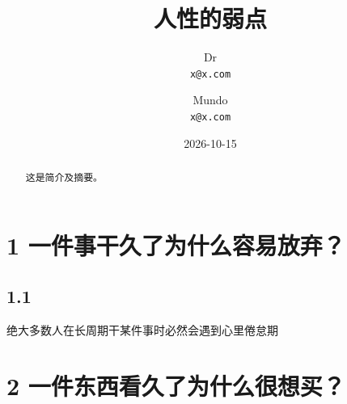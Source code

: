 \documentclass{article}
\title{\textbf{人性}的弱点} %
\author{
    Dr\\ %
    {\small \texttt{x@x.com}} %
    \and %
    Mundo\\
    {\small \texttt{x@x.com}}
}
\date{2026-10-15} %
\begin{document}
\maketitle %


\begin{abstract}
这是简介及摘要。
\end{abstract}

\section*{1 一件事干久了为什么容易放弃？} %

\subsection*{1.1}

绝大多数人在长周期干某件事时必然会遇到心里倦怠期

\section*{2 一件东西看久了为什么很想买？}


\clearpage
\end{document}
